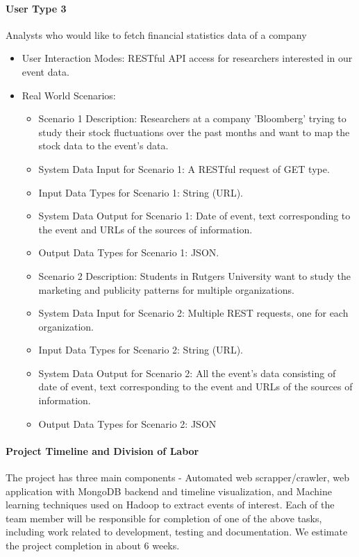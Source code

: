 \paragraph{User Type 3}
Analysts who would like to fetch financial statistics data of a company
\begin{itemize}
\item User Interaction Modes: RESTful API access for researchers interested in
  our event data.
\item Real World Scenarios: 
  \begin{itemize} 
  \item Scenario 1 Description: Researchers at a company 'Bloomberg' trying to
    study their stock fluctuations over the past months and want to map the
    stock data to the event's data.
  \item System Data Input for Scenario 1: A RESTful request of GET type.
  \item Input Data Types for Scenario 1: String (URL).
  \item System Data Output for Scenario 1: Date of event, text corresponding to
    the event and URLs of the sources of information.
  \item Output Data Types for Scenario 1: JSON.
  \item Scenario 2 Description: Students in Rutgers University want to study
    the marketing and publicity patterns for multiple organizations.
  \item System Data Input for Scenario 2: Multiple REST requests, one for each
    organization.
  \item Input Data Types for Scenario 2: String (URL).
  \item System Data Output for Scenario 2: All the event's data consisting of
    date of event, text corresponding to the event and URLs of the sources of
    information.
  \item Output Data Types for Scenario 2: JSON
  \end{itemize}
\end{itemize}

\paragraph{Project Timeline and Division of Labor}
The project has three main components - Automated web scrapper/crawler, web
application with MongoDB backend and timeline visualization, and Machine
learning techniques used on Hadoop to extract events of interest. Each of the
team member will be responsible for completion of one of the above tasks,
including work related to development, testing and documentation. We estimate
the project completion in about 6 weeks. 

